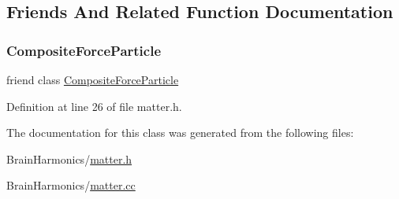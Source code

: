 \subsection{Friends And Related Function Documentation}
\mbox{\label{class_matter_a9bc6eb2a4c20ce83728a7c9a31b91f19}} 
\subsubsection{\texorpdfstring{Composite\+Force\+Particle}{CompositeForceParticle}}
{\footnotesize\ttfamily friend class \hyperlink{class_composite_force_particle}{Composite\+Force\+Particle}\hspace{0.3cm}{\ttfamily [friend]}}



Definition at line 26 of file matter.\+h.



The documentation for this class was generated from the following files\+:\begin{DoxyCompactItemize}
\item 
Brain\+Harmonics/\hyperlink{matter_8h}{matter.\+h}\item 
Brain\+Harmonics/\hyperlink{matter_8cc}{matter.\+cc}\end{DoxyCompactItemize}
